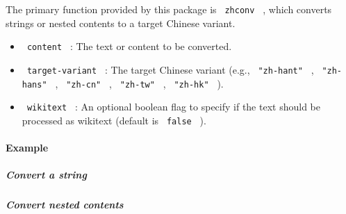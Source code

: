 The primary function provided by this package is \texttt{\ zhconv\ } ,
which converts strings or nested contents to a target Chinese variant.

\begin{Shaded}
\begin{Highlighting}[]
\end{Highlighting}
\end{Shaded}

\begin{itemize}
\tightlist
\item
  \texttt{\ content\ } : The text or content to be converted.
\item
  \texttt{\ target-variant\ } : The target Chinese variant (e.g.,
  \texttt{\ "zh-hant"\ } , \texttt{\ "zh-hans"\ } , \texttt{\ "zh-cn"\ }
  , \texttt{\ "zh-tw"\ } , \texttt{\ "zh-hk"\ } ).
\item
  \texttt{\ wikitext\ } : An optional boolean flag to specify if the
  text should be processed as wikitext (default is \texttt{\ false\ } ).
\end{itemize}

\paragraph{Example}\label{example}

\subparagraph{Convert a string}\label{convert-a-string}

\begin{Shaded}
\begin{Highlighting}[]
\end{Highlighting}
\end{Shaded}

\subparagraph{Convert nested contents}\label{convert-nested-contents}

\begin{Shaded}
\begin{Highlighting}[]
\NormalTok{\#zhconv([}

\NormalTok{], "zh{-}hans")}
\end{Highlighting}
\end{Shaded}

